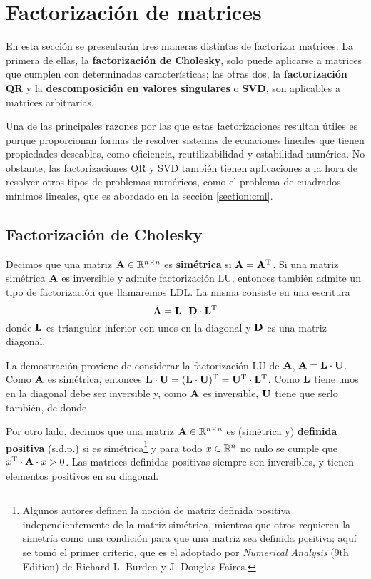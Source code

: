 
\section{Factorización de matrices}
\label{section:factorizacion-matrices}

En esta sección se presentarán tres maneras distintas de factorizar matrices.
La primera de ellas, la \textbf{factorización de Cholesky}, solo puede
aplicarse a matrices que cumplen con determinadas características; las otras
dos, la \textbf{factorización QR} y la \textbf{descomposición en valores
singulares} o \textbf{SVD}, son aplicables a matrices arbitrarias.

Una de las principales razones por las que estas factorizaciones resultan
útiles es porque proporcionan formas de resolver sistemas de ecuaciones
lineales que tienen propiedades deseables, como eficiencia, reutilizabilidad
y estabilidad numérica. No obstante, las factorizaciones QR y SVD también
tienen aplicaciones a la hora de resolver otros tipos de problemas numéricos,
como el problema de cuadrados mínimos lineales, que es abordado en la
sección \ref{section:cml}.

\subsection{Factorización de Cholesky}

Decimos que una matriz $\mathbf{A} \in \mathbb{R}^{n \times n}$ es
\textbf{simétrica} si $\mathbf{A} = \mathbf{A}^{\mathrm{T}}$.
Si una matriz simétrica $\mathbf{A}$ es inversible y admite factorización LU,
entonces también admite un tipo de factorización que llamaremos LDL.
La misma consiste en una escritura
\[ \mathbf{A} = \mathbf{L} \cdot \mathbf{D} \cdot \mathbf{L}^{\mathrm{T}} \]
donde $\mathbf{L}$ es triangular inferior con unos en la diagonal y $\mathbf{D}$
es una matriz diagonal.

La demostración proviene de considerar la factorización LU de $\mathbf{A}$,
$\mathbf{A} = \mathbf{L} \cdot \mathbf{U}$. Como $\mathbf{A}$ es simétrica, entonces
$\mathbf{L} \cdot \mathbf{U} = (\mathbf{L} \cdot \mathbf{U})^{\mathrm{T}} =
\mathbf{U}^{\mathrm{T}} \cdot \mathbf{L}^{\mathrm{T}}$. Como $\mathbf{L}$ tiene unos en la diagonal
debe ser inversible y, como $\mathbf{A}$ es inversible, $\mathbf{U}$ tiene que
serlo también, de donde %


Por otro lado, decimos que una matriz $\mathbf{A} \in \mathbb{R}^{n \times n}$
es (simétrica y) \textbf{definida positiva} (s.d.p.) si es
simétrica\footnote{Algunos autores definen la noción de matriz definida
positiva independientemente de la matriz simétrica, mientras que otros
requieren la simetría como una condición para que una matriz sea definida
positiva; aquí se tomó el primer criterio, que es el adoptado por
\emph{Numerical Analysis} (9th Edition) de Richard L. Burden y J. Douglas
Faires.}
y para todo $x \in \mathbb{R}^{n}$ no nulo se cumple que
$x^{\mathrm{T}} \cdot \mathbf{A} \cdot x > 0$. Las matrices definidas positivas siempre son inversibles, y tienen elementos positivos en su diagonal.

